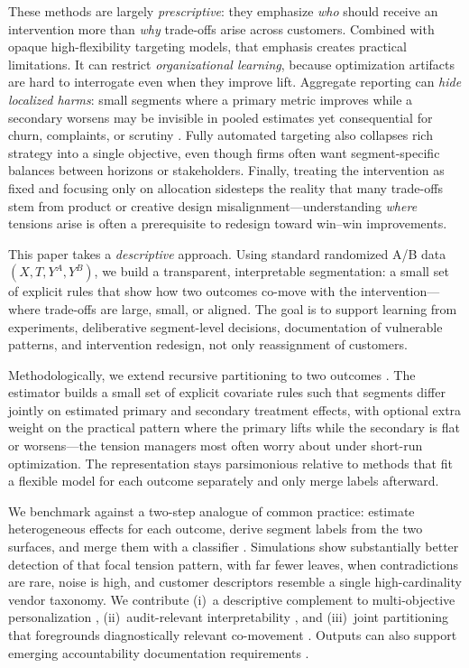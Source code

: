 \documentclass[12pt,a4paper]{article}
\begin{document}
These methods are largely \emph{prescriptive}: they emphasize \emph{who} should receive an intervention more than \emph{why} trade-offs arise across customers. Combined with opaque high-flexibility targeting models, that emphasis creates practical limitations. It can restrict \emph{organizational learning}, because optimization artifacts are hard to interrogate even when they improve lift. Aggregate reporting can \emph{hide localized harms}: small segments where a primary metric improves while a secondary worsens may be invisible in pooled estimates yet consequential for churn, complaints, or scrutiny \citep{lambrecht2019algorithmic, helberger2020choice}. Fully automated targeting also collapses rich strategy into a single objective, even though firms often want segment-specific balances between horizons or stakeholders. Finally, treating the intervention as fixed and focusing only on allocation sidesteps the reality that many trade-offs stem from product or creative design misalignment---understanding \emph{where} tensions arise is often a prerequisite to redesign toward win--win improvements.

This paper takes a \emph{descriptive} approach. Using standard randomized A/B data $(X,T,Y^A,Y^B)$, we build a transparent, interpretable segmentation: a small set of explicit rules that show how two outcomes co-move with the intervention---where trade-offs are large, small, or aligned. The goal is to support learning from experiments, deliberative segment-level decisions, documentation of vulnerable patterns, and intervention redesign, not only reassignment of customers.

Methodologically, we extend recursive partitioning to two outcomes \citep{athey2016recursive, wager2018estimation, athey2019grf}. The estimator builds a small set of explicit covariate rules such that segments differ jointly on estimated primary and secondary treatment effects, with optional extra weight on the practical pattern where the primary lifts while the secondary is flat or worsens---the tension managers most often worry about under short-run optimization. The representation stays parsimonious relative to methods that fit a flexible model for each outcome separately and only merge labels afterward.

We benchmark against a two-step analogue of common practice: estimate heterogeneous effects for each outcome, derive segment labels from the two surfaces, and merge them with a classifier \citep{rafieian2025multiobjective}. Simulations show substantially better detection of that focal tension pattern, with far fewer leaves, when contradictions are rare, noise is high, and customer descriptors resemble a single high-cardinality vendor taxonomy. We contribute (i)~a descriptive complement to multi-objective personalization \citep{rafieian2025multiobjective, ascarza2024doingmore}, (ii)~audit-relevant interpretability \citep{chandy2021better, lambrecht2019algorithmic, raji2020_internal_audit}, and (iii)~joint partitioning that foregrounds diagnostically relevant co-movement \citep{kunzel2019metalearners, nie2021quasioracle}. Outputs can also support emerging accountability documentation requirements \citep{dsa2022article34}.
\end{document}
